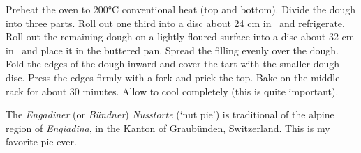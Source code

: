 Preheat the oven to 200°C conventional heat (top and bottom).
Divide the dough into three parts.
Roll out one third into a disc about 24 cm in \diameter\ and refrigerate.
Roll out the remaining dough on a lightly floured surface into a disc about 32 cm in \diameter\ and place it in the buttered pan.
Spread the filling evenly over the dough.
Fold the edges of the dough inward and cover the tart with the smaller dough disc.
Press the edges firmly with a fork and prick the top.
Bake on the middle rack for about 30 minutes.
Allow to cool completely (this is quite important).

\vspace*{0.75 cm}

\begin{recipeblock}
	\noindent The \textit{Engadiner} (or \textit{Bündner}) \textit{Nusstorte} (`nut pie') is traditional of the alpine region of \textit{Engiadina}, in the Kanton of Graubünden, Switzerland. This is my favorite pie ever. 
\end{recipeblock}





